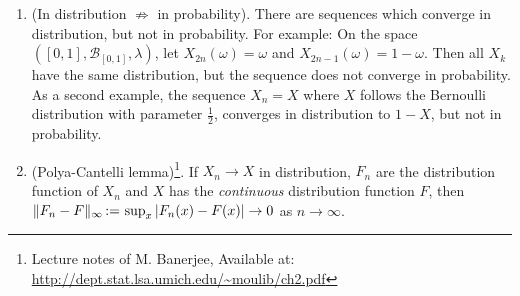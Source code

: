 \documentclass[a4paper,10pt]{article}
\begin{document}
\begin{enumerate}
\item (In distribution $\not\Rightarrow$ in probability). There are sequences which converge in distribution,
      but not in probability. For example: On the space $([0,1], \mathcal{B}_{[0,1]},\lambda)$, let $X_{2n}(\omega)=\omega$
      and $X_{2n-1}(\omega) = 1-\omega$. Then all $X_k$ have the same distribution, but the sequence does not 
      converge in probability. As a second example, the sequence $X_n=X$ where $X$ follows the Bernoulli distribution
      with parameter $\frac{1}{2}$, converges in distribution to $1-X$, but not in probability.
      
\item (Polya-Cantelli lemma)\footnote{Lecture notes of M. Banerjee, Available at: \url{http://dept.stat.lsa.umich.edu/~moulib/ch2.pdf}}. If $X_n\to X$ in distribution, $F_n$ are the distribution function of $X_n$ and 
      $X$ has the \textit{continuous} distribution function $F$, then $\|F_n - F\|_\infty {}\mathop{\mathrel{:}=}{} \sup_{x}|F_n(x) - F(x)| \to 0$
      as $n\to\infty$.
\end{enumerate}
\end{document}
